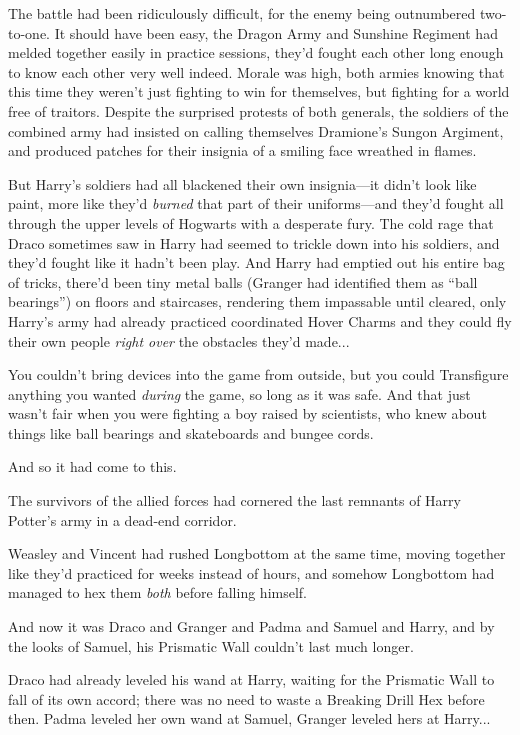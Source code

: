 The battle had been ridiculously difficult, for the enemy being outnumbered two-to-one. It should have been easy, the Dragon Army and Sunshine Regiment had melded together easily in practice sessions, they’d fought each other long enough to know each other very well indeed. Morale was high, both armies knowing that this time they weren’t just fighting to win for themselves, but fighting for a world free of traitors. Despite the surprised protests of both generals, the soldiers of the combined army had insisted on calling themselves Dramione’s Sungon Argiment, and produced patches for their insignia of a smiling face wreathed in flames.

But Harry’s soldiers had all blackened their own insignia—it didn’t look like paint, more like they’d \emph{burned} that part of their uniforms—and they’d fought all through the upper levels of Hogwarts with a desperate fury. The cold rage that Draco sometimes saw in Harry had seemed to trickle down into his soldiers, and they’d fought like it hadn’t been play. And Harry had emptied out his entire bag of tricks, there’d been tiny metal balls (Granger had identified them as “ball bearings”) on floors and staircases, rendering them impassable until cleared, only Harry’s army had already practiced coordinated Hover Charms and they could fly their own people \emph{right over} the obstacles they’d made...

You couldn’t bring devices into the game from outside, but you could Transfigure anything you wanted \emph{during} the game, so long as it was safe. And that just wasn’t fair when you were fighting a boy raised by scientists, who knew about things like ball bearings and skateboards and bungee cords.

And so it had come to this.

The survivors of the allied forces had cornered the last remnants of Harry Potter’s army in a dead-end corridor.

Weasley and Vincent had rushed Longbottom at the same time, moving together like they’d practiced for weeks instead of hours, and somehow Longbottom had managed to hex them \emph{both} before falling himself.

And now it was Draco and Granger and Padma and Samuel and Harry, and by the looks of Samuel, his Prismatic Wall couldn’t last much longer.

Draco had already leveled his wand at Harry, waiting for the Prismatic Wall to fall of its own accord; there was no need to waste a Breaking Drill Hex before then. Padma leveled her own wand at Samuel, Granger leveled hers at Harry...

